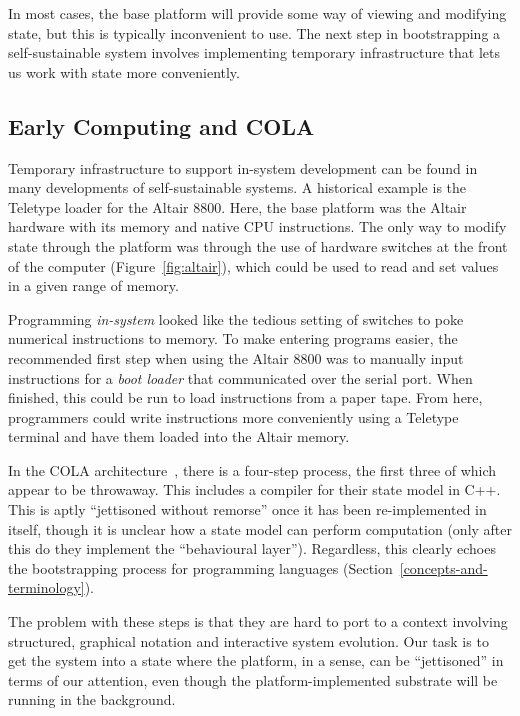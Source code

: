\documentclass[ twoside,openright,titlepage,numbers=noenddot,headinclude,footinclude,cleardoublepage=empty,abstract=on,
                BCOR=5mm,paper=a4,fontsize=11pt
                ]{scrreprt}
\theoremstyle{definition}
\begin{document}
In most cases, the base platform will provide some way of viewing and
modifying state, but this is typically inconvenient to use. The next
step in bootstrapping a self-sustainable system involves implementing
temporary infrastructure that lets us work with state more conveniently.

\hypertarget{early-computing-and}{\subsection{\texorpdfstring{Early Computing and
\acs{COLA}}{Early Computing and }}\label{early-computing-and}}

Temporary infrastructure to support in-system development can be found
in many developments of self-sustainable systems. A historical example
is the Teletype loader for the Altair 8800. Here, the base platform was
the Altair hardware with its memory and native CPU instructions. The
only way to modify state through the platform was through the use of
hardware switches at the front of the computer
(Figure~\ref{fig:altair}), which could be used to read and set values in
a given range of memory.

Programming \emph{in-system} looked like the tedious setting of switches
to poke numerical instructions to memory. To make entering programs
easier, the recommended first step when using the Altair 8800 was to
manually input instructions for a \emph{boot loader} that communicated
over the serial port. When finished, this could be run to load
instructions from a paper tape. From here, programmers could write
instructions more conveniently using a Teletype terminal and have them
loaded into the Altair memory.

In the \ac{COLA}
architecture~\parencite[Section\ 6.1 "Bootstrapping"]{COLAs}, there is a
four-step process, the first three of which appear to be throwaway. This
includes a compiler for their state model in C++. This is aptly
``jettisoned without remorse'' once it has been re-implemented in
itself, though it is unclear how a state model can perform computation
(only after this do they implement the ``behavioural layer'').
Regardless, this clearly echoes the bootstrapping process for
programming languages (Section~\ref{concepts-and-terminology}).

The problem with these steps is that they are hard to port to a context
involving structured, graphical notation and interactive system
evolution. Our task is to get the system into a state where the
platform, in a sense, can be ``jettisoned'' in terms of our attention,
even though the platform-implemented substrate will be running in the
background.
\end{document}
